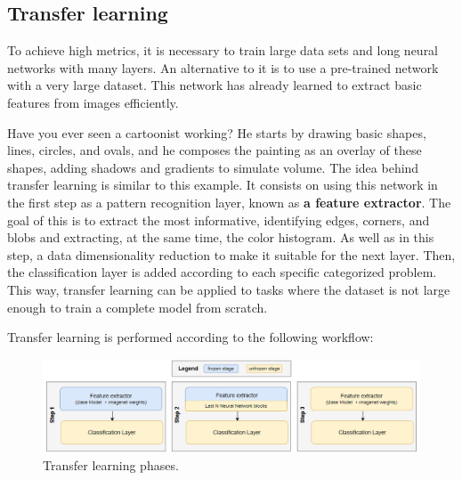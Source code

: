 \subsection{Transfer learning}

To achieve high metrics, it is necessary to train large data sets and long neural networks with many layers. An alternative to it is to use a pre-trained network with a very large dataset. This network has already learned to extract basic features from images efficiently. 

Have you ever seen a cartoonist working? He starts by drawing basic shapes, lines, circles, and ovals, and he composes the painting as an overlay of these shapes, adding shadows and gradients to simulate volume. The idea behind transfer learning is similar to this example. It consists on using this network in the first step as a pattern recognition layer, known as \textbf{a feature extractor}. The goal of this is to extract the most informative, identifying edges, corners, and blobs and extracting, at the same time, the color histogram.  As well as in this step, a data dimensionality reduction to make it suitable for the next layer. Then, the classification layer is added according to each specific categorized problem. This way, transfer learning can be applied to tasks where the dataset is not large enough to train a complete model from scratch.

Transfer learning is performed according to the following workflow:

\begin{figure}[ht]
    \begin{center}
        \includegraphics[scale=0.80]{images/Building/Transfer learning/Transfer Learning phases.png}
        \caption{Transfer learning phases.}
    \label{fig: Transfer learning phases}    
    \end{center}
\end{figure}

